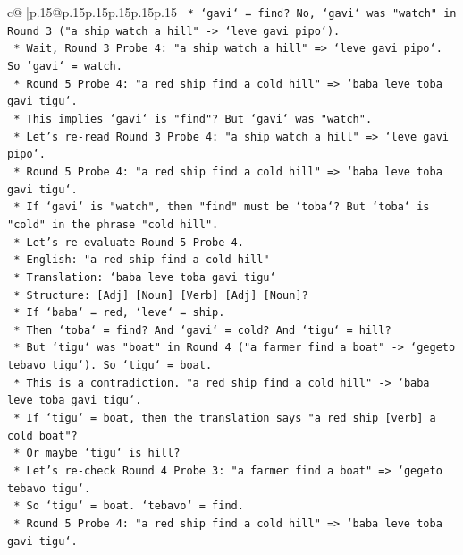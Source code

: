 \documentclass{article}
\begin{document}
{\begin{supertabular}{c@{$\;$}|p{.15\linewidth}@{}p{.15\linewidth}p{.15\linewidth}p{.15\linewidth}p{.15\linewidth}p{.15\linewidth}}
{{{\texttt{        *   `gavi` = find? No, `gavi` was "watch" in Round 3 ("a ship watch a hill" {-}> `leve gavi pipo`).} \\
\texttt{        *   Wait, Round 3 Probe 4: "a ship watch a hill" => `leve gavi pipo`. So `gavi` = watch.} \\
\texttt{        *   Round 5 Probe 4: "a red ship find a cold hill" => `baba leve toba gavi tigu`.} \\
\texttt{        *   This implies `gavi` is "find"? But `gavi` was "watch".} \\
\texttt{        *   Let's re{-}read Round 3 Probe 4: "a ship watch a hill" => `leve gavi pipo`.} \\
\texttt{        *   Round 5 Probe 4: "a red ship find a cold hill" => `baba leve toba gavi tigu`.} \\
\texttt{        *   If `gavi` is "watch", then "find" must be `toba`? But `toba` is "cold" in the phrase "cold hill".} \\
\texttt{        *   Let's re{-}evaluate Round 5 Probe 4.} \\
\texttt{        *   English: "a red ship find a cold hill"} \\
\texttt{        *   Translation: `baba leve toba gavi tigu`} \\
\texttt{        *   Structure: {[}Adj{]} {[}Noun{]} {[}Verb{]} {[}Adj{]} {[}Noun{]}?} \\
\texttt{        *   If `baba` = red, `leve` = ship.} \\
\texttt{        *   Then `toba` = find? And `gavi` = cold? And `tigu` = hill?} \\
\texttt{        *   But `tigu` was "boat" in Round 4 ("a farmer find a boat" {-}> `gegeto tebavo tigu`). So `tigu` = boat.} \\
\texttt{        *   This is a contradiction. "a red ship find a cold hill" {-}> `baba leve toba gavi tigu`.} \\
\texttt{        *   If `tigu` = boat, then the translation says "a red ship {[}verb{]} a cold boat"?} \\
\texttt{        *   Or maybe `tigu` is hill?} \\
\texttt{        *   Let's re{-}check Round 4 Probe 3: "a farmer find a boat" => `gegeto tebavo tigu`.} \\
\texttt{        *   So `tigu` = boat. `tebavo` = find.} \\
\texttt{        *   Round 5 Probe 4: "a red ship find a cold hill" => `baba leve toba gavi tigu`.} \\
}}}
\end{supertabular}}
\end{document}
